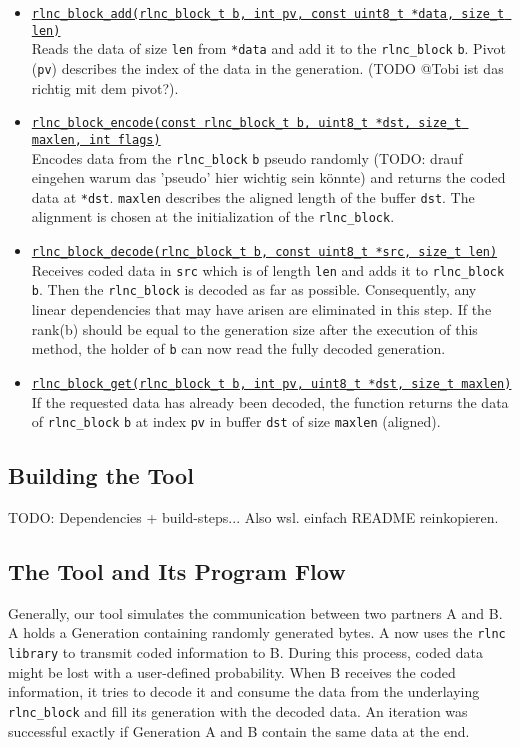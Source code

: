\documentclass[a4paper,english,10pt]{tumarticle}
\begin{document}
\begin{itemize}
    \item \underline{\texttt{rlnc\_block\_add(rlnc\_block\_t b, int pv, const uint8\_t *data, size\_t len)}}\\
    Reads the data of size \texttt{len} from \texttt{*data} and add it to the \texttt{rlnc\_block} \texttt{b}. Pivot (\texttt{pv}) describes the index of the data in the generation. 
    (TODO @Tobi ist das richtig mit dem pivot?). 

    \item \underline{\texttt{rlnc\_block\_encode(const rlnc\_block\_t b, uint8\_t *dst, size\_t maxlen, int flags)}}\\
    Encodes data from the \texttt{rlnc\_block} \texttt{b} pseudo randomly (TODO: drauf eingehen warum das 'pseudo' hier wichtig sein könnte) and returns the coded data at \texttt{*dst}. 
    \texttt{maxlen} describes the aligned length of the buffer \texttt{dst}. The alignment is chosen at the initialization of the \texttt{rlnc\_block}.
    
    \item \underline{\texttt{rlnc\_block\_decode(rlnc\_block\_t b, const uint8\_t *src, size\_t len)}}\\
    Receives coded data in \texttt{src} which is of length \texttt{len} and adds it to \texttt{rlnc\_block} \texttt{b}. 
    Then the \texttt{rlnc\_block} is decoded as far as possible. 
    Consequently, any linear dependencies that may have arisen are eliminated in this step. If the rank(b) should 
    be equal to the generation size after the execution of this method, the holder of \texttt{b} can now read the fully decoded generation.

    \item \underline{\texttt{rlnc\_block\_get(rlnc\_block\_t b, int pv, uint8\_t *dst, size\_t maxlen)}}\\
    If the requested data has already been decoded, the function returns the data of \texttt{rlnc\_block} \texttt{b} at index \texttt{pv} in buffer 
    \texttt{dst} of size \texttt{maxlen} (aligned).
  \end{itemize}

\subsection{Building the Tool}\label{app:build}
TODO: Dependencies + build-steps... Also wsl. einfach README reinkopieren. 

\subsection{The Tool and Its Program Flow}\label{sec:tool}
Generally, our tool simulates the communication between two partners A and B. 
A holds a Generation containing randomly generated bytes. A now uses the \texttt{rlnc library} to transmit coded information to B. 
During this process, coded data might be lost with a user-defined probability. When B receives the coded information, 
it tries to decode it and consume the data from the underlaying \texttt{rlnc\_block} and fill its generation with the decoded data. 
An iteration was successful exactly if Generation A and B contain the same data at the end.
\end{document}
